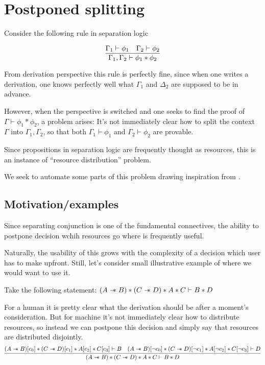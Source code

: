 \chapter{Postponed splitting}

Consider the following rule in separation logic

$$\infer{\Gamma_1, \Gamma_2 \vdash \phi_1 \ast \phi_2}
      {\Gamma_1 \vdash \phi_1 &
       \Gamma_2 \vdash \phi_2}$$

From derivation perspective this rule is perfectly fine, since when one writes a derivation, one knows perfectly well what $\Gamma_1$ and $\Delta_2$ are supposed to be in advance.

However, when the perspective is switched and one seeks to find the proof of $\Gamma \vdash \phi_1 \ast \phi_2$, a problem arises:
It's not immediately clear how to split the context $\Gamma$ into $\Gamma_1, \Gamma_2$, so that both $\Gamma_1 \vdash \phi_1$ and $\Gamma_2 \vdash \phi_2$ are provable.

Since propositions in separation logic are frequently thought as resources, this is an instance of ``resource distribution'' problem.

We seek to automate some parts of this problem drawing inspiration from \citet{Harland_Pym_2003}.

\section{Motivation/examples}

Since separating conjunction is one of the fundamental connectives, the ability to postpone decision wchih resources go where is frequently useful.

Naturally, the usability of this grows with the complexity of a decision which user has to make upfront.
Still, let's consider small illustrative example of where we would want to use it.

Take the following statement:
$(A \mathrel{-\mkern-6mu*} B) \ast (C \mathrel{-\mkern-6mu*} D) \ast A \ast C \vdash B \ast D$

For a human it is pretty clear what the derivation should be after a moment's consideration.
But for machine it's not immediately clear how to distribute resources, so instead we can postpone this decision and simply say that resources are distributed disjointly.
$$
\infer{(A \wand B) \ast (C \wand D) \ast A \ast C \vdash B \ast D}
      {(A \wand B)[c_0] \ast (C \wand D)[c_1] \ast A[c_2] \ast C[c_3] \vdash B
       &
       (A \wand B)[\neg c_0] \ast (C \wand D)[\neg c_1] \ast A[\neg c_2] \ast C[\neg c_3] \vdash D}
$$

